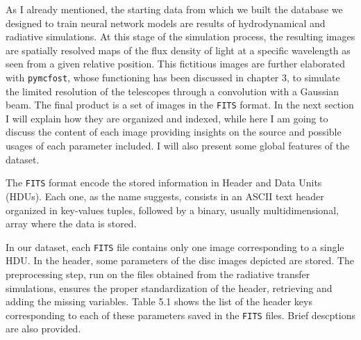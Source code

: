 \documentclass[a4paper,10pt]{report}
\begin{document}
As I already mentioned, the starting data from which we built the database 
we designed to train neural network models are results
of hydrodynamical and radiative simulations.
At this stage of the simulation process, the resulting images
are spatially resolved maps of the flux density of light at a specific wavelength as seen 
from a given relative position.
This fictitious images are further elaborated with \lstinline{pymcfost},
whose functioning has been discussed in chapter 3, to simulate the limited resolution of
the telescopes through a convolution with a Gaussian beam.
The final product is a set of images in the \lstinline{FITS} format. In the next section I will explain how they are organized
and indexed, while here I am going to discuss the content of each image providing insights on the source and
possible usages of each parameter included. I will also present some global features of the dataset.

The \lstinline{FITS} format encode the stored information in Header and Data Units (HDUs).
Each one, as the name suggests, consists in an ASCII text header organized in key-values tuples, followed 
by a binary, usually multidimensional, array where the data is stored.

In our dataset, each \lstinline{FITS} file contains only one image corresponding to a single HDU.
In the header, some parameters of the disc images depicted are stored. 
The preprocessing step, run on the files obtained from the radiative transfer simulations, ensures
the proper standardization of the header, retrieving and adding the missing variables.
Table 5.1 shows the list of the header keys corresponding to each of these parameters
saved in the \lstinline{FITS} files. Brief descptions are also provided.
\end{document}
